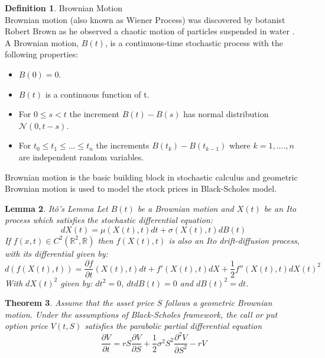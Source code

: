 \documentclass[12pt, oneside]{book}
\theoremstyle{plain}
\newtheorem{theorem}{Theorem}[section]
\newtheorem{lemma}[theorem]{Lemma}
\theoremstyle{definition}
\newtheorem{definition}[theorem]{Definition}
\begin{document}
\begin{definition} Brownian Motion \\
Brownian motion (also known as Wiener Process) was discovered by botanist Robert Brown as he observed a chaotic motion of particles suspended in water \cite{BM}. A  Brownian  motion, $B(t)$,  is  a  continuous-time  stochastic  process  with  the  following properties: 
\begin{itemize}
\item $ B(0) = 0 $.
\item $ B(t) $ is a continuous function of t.
\item For $ 0  \leq s < t $ the increment $ B(t) -  B(s)  $ has normal distribution  $ \mathcal{N}(0, t-s) $.
\item  For $ t_0  \leq  t_1 \leq ... \leq  t_n $ the increments $ B(t_k) - B(t_{k-1}) $ where $k=1, .... ,n $ are independent random variables.
\end{itemize}    
Brownian motion is the basic building block in stochastic calculus and geometric Brownian motion is used to model the stock prices in Black-Scholes model.
\end{definition}

\begin{lemma} It\^{o}'s Lemma
Let $B(t)$ be a Brownian motion and $X(t)$ be an Ito process which satisfies the stochastic differential equation:
\begin{equation}
dX(t) = \mu(X(t),t)dt + \sigma(X(t),t)dB(t)
\end{equation} 
If $f(x, t) \in C^2(\mathbb{R}^2,\mathbb{R})$ then $f(X(t),t)$ is also an Ito drift-diffusion process, with its differential given by:
\begin{equation}
d(f(X(t),t)) = \frac{\partial f}{\partial t}(X(t),t)dt + f'(X(t),t)dX + \frac{1}{2}f''(X(t),t)dX(t)^2
\end{equation} 
With $dX(t)^2$ given by: $dt^2 = 0$, $dt dB(t) = 0$ and $dB(t)^2 = dt$.
\end{lemma}

\begin{theorem}
Assume that the asset price $S$ follows a geometric Brownian motion.  Under the assumptions of Black-Scholes framework, the call or put option price $V(t,S)$ satisfies the parabolic partial differential equation
\begin{equation}
\frac{\partial V}{\partial t} = rS\frac{\partial V}{\partial S}+\frac{1}{2} \sigma^2 S^2 \frac{\partial^2 V}{\partial S^2} - rV
\end{equation}
\end{theorem}
\end{document}
